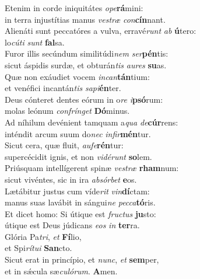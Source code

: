 \evenverse Etenim in corde iniquitátes \textit{o}\textit{pe}\textbf{rá}mini:~\*\\
\evenverse in terra injustítias manus \textit{ve}\textit{stræ} \textit{con}\textbf{cín}nant.\\
\oddverse Alienáti sunt peccatóres a vulva, erravé\textit{runt} \textit{ab} \textbf{ú}tero:~\*\\
\oddverse lo\textit{cú}\textit{ti} \textit{sunt} \textbf{fal}sa.\\
\evenverse Furor illis secúndum similitúdi\textit{nem} \textit{ser}\textbf{pén}tis:~\*\\
\evenverse sicut áspidis surdæ, et obturán\textit{tis} \textit{au}\textit{res} \textbf{su}as.\\
\oddverse Quæ non exáudiet vocem \textit{in}\textit{can}\textbf{tán}tium:~\*\\
\oddverse et venéfici incantán\textit{tis} \textit{sa}\textit{pi}\textbf{én}ter.\\
\evenverse Deus cónteret dentes eórum in o\textit{re} \textit{i}\textbf{psó}rum:~\*\\
\evenverse molas leónum \textit{con}\textit{frín}\textit{get} \textbf{Dó}minus.\\
\oddverse Ad níhilum devénient tamquam a\textit{qua} \textit{de}\textbf{cúr}rens:~\*\\
\oddverse inténdit arcum suum do\textit{nec} \textit{in}\textit{fir}\textbf{mén}tur.\\
\evenverse Sicut cera, quæ fluit, \textit{au}\textit{fe}\textbf{rén}tur:~\*\\
\evenverse supercécidit ignis, et non \textit{vi}\textit{dé}\textit{runt} \textbf{so}lem.\\
\oddverse Priúsquam intellígerent spinæ \textit{ve}\textit{stræ} \textbf{rham}num:~\*\\
\oddverse sicut vivéntes, sic in ira \textit{ab}\textit{sór}\textit{bet} \textbf{e}os.\\
\evenverse Lætábitur justus cum víde\textit{rit} \textit{vin}\textbf{dí}ctam:~\*\\
\evenverse manus suas lavábit in sángui\textit{ne} \textit{pec}\textit{ca}\textbf{tó}ris.\\
\oddverse Et dicet homo: Si útique est \textit{fru}\textit{ctus} \textbf{ju}sto:~\*\\
\oddverse útique est Deus júdicans \textit{e}\textit{os} \textit{in} \textbf{ter}ra.\\
\evenverse Glória Pa\textit{tri}, \textit{et} \textbf{Fí}lio,~\*\\
\evenverse et Spi\textit{rí}\textit{tu}\textit{i} \textbf{San}cto.\\
\oddverse Sicut erat in princípio, et \textit{nunc}, \textit{et} \textbf{sem}per,~\*\\
\oddverse et in sǽcula sæ\textit{cu}\textit{ló}\textit{rum}. \textbf{A}men.\\
